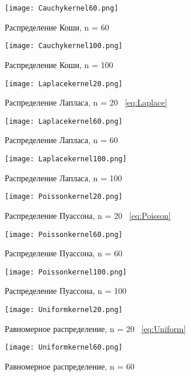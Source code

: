 \documentclass[12pt,a4paper]{scrartcl}
\begin{document}
\begin{figure}[H]
  \centering
  \texttt{[image: Cauchykernel60.png]}
  \caption{Распределение Коши, n = 60}
\end{figure}

\begin{figure}[H]
  \centering
  \texttt{[image: Cauchykernel100.png]}
  \caption{Распределение Коши, n = 100}
\end{figure}

\begin{figure}[H]
\centering
  \texttt{[image: Laplacekernel20.png]}
  \caption{Распределение Лапласа, n = 20 ~\eqref{eq:Laplace}}
\end{figure}

\begin{figure}[H]
\centering
  \texttt{[image: Laplacekernel60.png]}
  \caption{Распределение Лапласа, n = 60}
\end{figure}

\begin{figure}[H]
\centering
  \texttt{[image: Laplacekernel100.png]}
  \caption{Распределение Лапласа, n = 100}
\end{figure}

\begin{figure}[H]
  \centering
  \texttt{[image: Poissonkernel20.png]}
  \caption{Распределение Пуассона, n = 20 ~\eqref{eq:Poisson}}
\end{figure}

\begin{figure}[H]
  \centering
  \texttt{[image: Poissonkernel60.png]}
  \caption{Распределение Пуассона, n = 60}
\end{figure}

\begin{figure}[H]
  \centering
  \texttt{[image: Poissonkernel100.png]}
  \caption{Распределение Пуассона, n = 100}
\end{figure}

\begin{figure}[H]
  \centering
  \texttt{[image: Uniformkernel20.png]}
  \caption{Равномерное распределение, n = 20 ~\eqref{eq:Uniform}}
\end{figure}

\begin{figure}[H]
  \centering
  \texttt{[image: Uniformkernel60.png]}
  \caption{Равномерное распределение, n = 60}
\end{figure}
\end{document}
